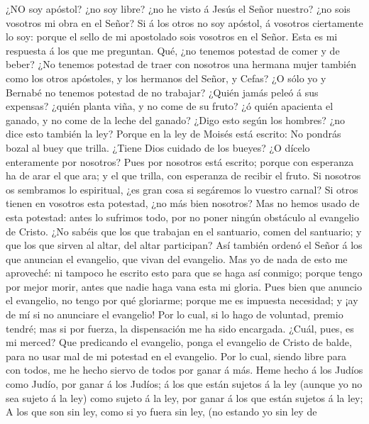  ¿NO soy apóstol? ¿no soy libre? ¿no he visto á Jesús el
Señor nuestro? ¿no sois vosotros mi obra en el Señor?  Si á
los otros no soy apóstol, á vosotros ciertamente lo soy: porque el sello
de mi apostolado sois vosotros en el Señor.  Esta es mi
respuesta á los que me preguntan.  Qué, ¿no tenemos potestad
de comer y de beber?  ¿No tenemos potestad de traer con
nosotros una hermana mujer también como los otros apóstoles, y los
hermanos del Señor, y Cefas?  ¿O sólo yo y Bernabé no
tenemos potestad de no trabajar?  ¿Quién jamás peleó á sus
expensas? ¿quién planta viña, y no come de su fruto? ¿ó quién apacienta
el ganado, y no come de la leche del ganado?  ¿Digo esto
según los hombres? ¿no dice esto también la ley?  Porque en
la ley de Moisés está escrito: No pondrás bozal al buey que trilla.
¿Tiene Dios cuidado de los bueyes?  ¿O dícelo enteramente
por nosotros? Pues por nosotros está escrito; porque con esperanza ha de
arar el que ara; y el que trilla, con esperanza de recibir el fruto.
 Si nosotros os sembramos lo espiritual, ¿es gran cosa si
segáremos lo vuestro carnal?  Si otros tienen en vosotros
esta potestad, ¿no más bien nosotros? Mas no hemos usado de esta
potestad: antes lo sufrimos todo, por no poner ningún obstáculo al
evangelio de Cristo.  ¿No sabéis que los que trabajan en el
santuario, comen del santuario; y que los que sirven al altar, del altar
participan?  Así también ordenó el Señor á los que anuncian
el evangelio, que vivan del evangelio.  Mas yo de nada de
esto me aproveché: ni tampoco he escrito esto para que se haga así
conmigo; porque tengo por mejor morir, antes que nadie haga vana esta mi
gloria.  Pues bien que anuncio el evangelio, no tengo por
qué gloriarme; porque me es impuesta necesidad; y ¡ay de mí si no
anunciare el evangelio!  Por lo cual, si lo hago de
voluntad, premio tendré; mas si por fuerza, la dispensación me ha sido
encargada.  ¿Cuál, pues, es mi merced? Que predicando el
evangelio, ponga el evangelio de Cristo de balde, para no usar mal de mi
potestad en el evangelio.  Por lo cual, siendo libre para
con todos, me he hecho siervo de todos por ganar á más. 
Heme hecho á los Judíos como Judío, por ganar á los Judíos; á los que
están sujetos á la ley (aunque yo no sea sujeto á la ley) como sujeto á
la ley, por ganar á los que están sujetos á la ley;  A los
que son sin ley, como si yo fuera sin ley, (no estando yo sin ley de
